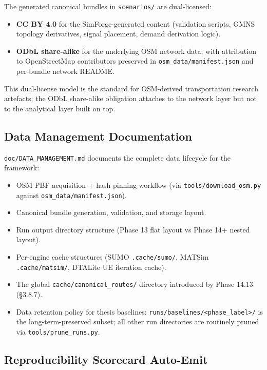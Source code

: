 The generated canonical bundles in \texttt{scenarios/} are
dual-licensed:

\begin{itemize}
\tightlist
\item
  \textbf{CC BY 4.0} for the SimForge-generated content (validation
  scripts, GMNS topology derivatives, signal placement, demand
  derivation logic).
\item
  \textbf{ODbL share-alike} for the underlying OSM network data, with
  attribution to OpenStreetMap contributors preserved in
  \texttt{osm\_data/manifest.json} and per-bundle network README.
\end{itemize}

This dual-license model is the standard for OSM-derived transportation
research artefacts; the ODbL share-alike obligation attaches to the
network layer but not to the analytical layer built on top.

\subsection{Data Management
Documentation}\label{3103-data-management-documentation}

\texttt{doc/DATA\_MANAGEMENT.md} documents the complete data lifecycle
for the framework:

\begin{itemize}
\tightlist
\item
  OSM PBF acquisition + hash-pinning workflow (via
  \texttt{tools/download\_osm.py} against
  \texttt{osm\_data/manifest.json}).
\item
  Canonical bundle generation, validation, and storage layout.
\item
  Run output directory structure (Phase 13 flat layout vs Phase 14+
  nested layout).
\item
  Per-engine cache structures (SUMO \texttt{.cache/sumo/}, MATSim
  \texttt{.cache/matsim/}, DTALite UE iteration cache).
\item
  The global \texttt{cache/canonical\_routes/} directory introduced by
  Phase 14.13 (§3.8.7).
\item
  Data retention policy for thesis baselines:
  \texttt{runs/baselines/\textless{}phase\_label\textgreater{}/} is the
  long-term-preserved subset; all other run directories are routinely
  pruned via \texttt{tools/prune\_runs.py}.
\end{itemize}

\subsection{Reproducibility Scorecard
Auto-Emit}\label{3104-reproducibility-scorecard-auto-emit}

